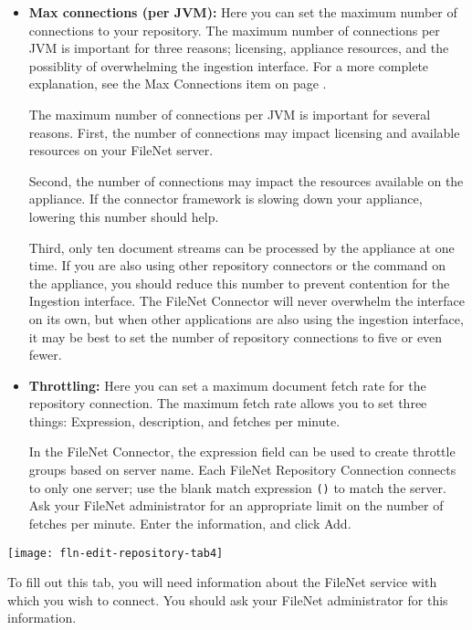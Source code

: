 \begin{itemize}

\item \textbf{Max connections (per JVM):} Here you can set the maximum
number of connections to your repository.  \ifCombinedConnectorGuide
The maximum number of connections per JVM is important for three
reasons; licensing, appliance resources, and the possiblity of
overwhelming the ingestion interface. For a more complete explanation,
see the Max Connections item on page \pageref{maxrepocon}.\fi

\ifJDBCGuide
The maximum number of connections per JVM is important for several
reasons.  First, the number of connections may impact licensing and
available resources on your FileNet server.

Second, the number of connections may impact the resources available
on the appliance. If the connector framework is slowing down your
appliance, lowering this number should help.

Third, only ten document streams can be processed by the appliance
at one time.  If you are also using other repository connectors or
the  command on the appliance, you should reduce this
number to prevent contention for the Ingestion interface. The FileNet 
Connector will never overwhelm the interface on its own, but when other
applications are also using the ingestion interface, it may be best to
set the number of repository connections to five or even fewer.
\fi


\item \textbf{Throttling:} Here you can set a maximum document fetch
rate for the repository connection.  The maximum fetch rate allows you
to set three things: Expression, description, and fetches per minute.

In the FileNet Connector, the expression field can be used to create
throttle groups based on server name. Each FileNet Repository
Connection connects to only one server; use the blank match expression
\texttt{()} to match the server. Ask your FileNet administrator for an
appropriate limit on the number of fetches per minute. Enter the
information, and click Add.

\end{itemize}

\texttt{[image: fln-edit-repository-tab4]}

To fill out this tab, you will need information about the FileNet
service with which you wish to connect. You should ask your FileNet
administrator for this information.

